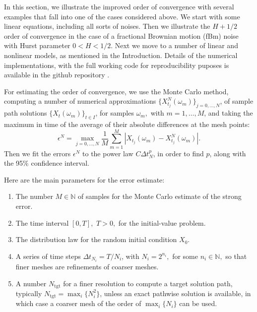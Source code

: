 \documentclass[reqno,12pt]{amsart}
\theoremstyle{plain} %
\theoremstyle{definition} %
\begin{document}
In this section, we illustrate the improved order of convergence with several examples that fall into one of the cases considered above. We start with some linear equations, including all sorts of noises. Then we illustrate the $H + 1/2$ order of convergence in the case of a fractional Brownian motion (fBm) noise with Hurst parameter $0 < H < 1/2$. Next we move to a number of linear and nonlinear models, as mentioned in the Introduction. Details of the numerical implementations, with the full working code for reproducibility puposes is available in the github repository \cite{RODEConvEM2023}.

For estimating the order of convergence, we use the Monte Carlo method, computing a number of numerical approximations $\{X_{t_j}^N(\omega_m)\}_{j=0, \ldots, N}$, of sample path solutions $\{X_t(\omega_m)\}_{t\in I}$, for samples $\omega_m,$ with $m = 1, \ldots, M$, and taking the maximum in time of the average of their absolute differences at the mesh points:
\begin{equation}
    \epsilon^N = \max_{j=0, \ldots, N} \frac{1}{M}\sum_{m=1}^M \left|X_{t_j}(\omega_m) - X_{t_j}^N(\omega_m)\right|.
\end{equation}
Then we fit the errors $\epsilon^N$ to the power law $C\Delta t_N^p$, in order to find $p$, along with the 95\% confidence interval.

Here are the main parameters for the error estimate:
\begin{enumerate}
    \item The number $M\in\mathbb{N}$ of samples for the Monte Carlo estimate of the strong error.
    \item The time interval $[0, T], $ $T > 0,$ for the initial-value problem.
    \item The distribution law for the random initial condition $X_0$.
    \item A series of time steps $\Delta t_{N_i} = T/N_i$, with $N_i=2^{n_i},$ for some $n_i\in\mathbb{N},$ so that finer meshes are refinements of coarser meshes.
    \item A number $N_{\mathrm{tgt}}$ for a finer resolution to compute a target solution path, typically $N_{\mathrm{tgt}} = \max_i\{N_i^2\}$, unless an exact pathwise solution is available, in which case a coarser mesh of the order of $\max_i\{N_i\}$ can be used.
\end{enumerate}
\end{document}
